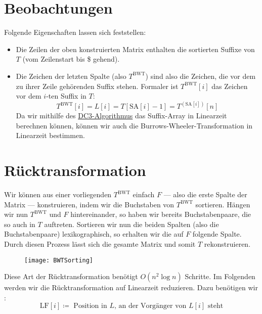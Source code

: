 \section{Beobachtungen}

Folgende Eigenschaften lassen sich feststellen:

\begin{itemize}
  \item Die Zeilen der oben konstruierten Matrix enthalten die sortierten Suffixe von \( T \) (vom Zeilenstart bis \$ gehend).
  \item Die Zeichen der letzten Spalte (also \( T^{\text{BWT}} \)) sind also die Zeichen, die vor dem zu ihrer Zeile gehörenden Suffix stehen. Formaler ist \( T^{\text{BWT}}[i] \) das Zeichen vor dem \( i \)-ten Suffix in \( T \):
  \begin{equation*}
    T^{\text{BWT}}[i] = L[i] = T[\text{SA}[i]-1] = T^{(\text{SA}[i])}[n]
  \end{equation*}
  Da wir mithilfe des \hyperref[sec:SALinear]{DC3-Algorithmus} das Suffix-Array in Linearzeit berechnen können, können wir auch die Burrows-Wheeler-Transformation in Linearzeit bestimmen.
\end{itemize}

\section{Rücktransformation}

\begin{minipage}{0.8\textwidth}
  Wir können aus einer vorliegenden \( T^{\text{BWT}} \) einfach \( F \) --- also die erste Spalte der Matrix --- konstruieren, indem wir die Buchstaben von \( T^{\text{BWT}} \) sortieren. Hängen wir nun \( T^{\text{BWT}} \) und \( F \) hintereinander, so haben wir bereits Buchstabenpaare, die so auch in \( T \) auftreten. Sortieren wir nun die beiden Spalten (also die Buchstabenpaare) lexikographisch, so erhalten wir die auf \( F \) folgende Spalte. Durch diesen Prozess lässt sich die gesamte Matrix und somit \( T \) rekonstruieren.
\end{minipage}
\hfill
\begin{minipage}{0.15\textwidth}
  \begin{figure}[H]
    \texttt{[image: BWTSorting]}
  \end{figure}
\end{minipage}

Diese Art der Rücktransformation benötigt \( O(n^2\log n) \) Schritte. Im Folgenden werden wir die Rücktransformation auf Linearzeit reduzieren. Dazu benötigen wir :
\begin{equation*}
  \text{LF}[i] \coloneqq \text{ Position in } L\text{, an der Vorgänger von } L[i] \text{ steht}
\end{equation*}


